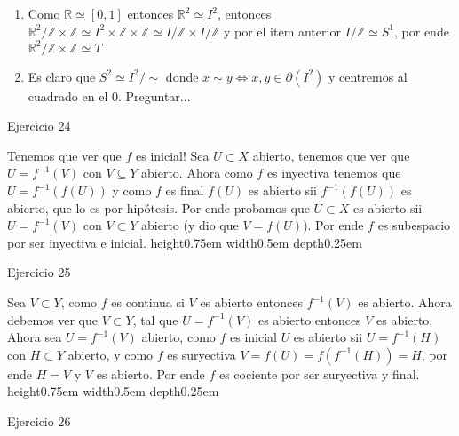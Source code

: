 \documentclass[11pt]{article}
\newcommand{\Z}{\mathbb{Z}}
\newcommand{\R}{{\mathbb{R}}}
\newenvironment{proof}[1][Demostraci\'on]{\begin{trivlist}
\item[\hskip \labelsep {\bfseries #1}]}{\end{trivlist}}
\newcommand{\qed}{\nobreak \ifvmode \relax \else
      \ifdim\lastskip<1.5em \hskip-\lastskip
      \hskip1.5em plus0em minus0.5em \fi \nobreak
      \vrule height0.75em width0.5em depth0.25em\fi}
\begin{document}
\begin{enumerate}
\begin{proof}
\begin{enumerate}
\item Como $\R \simeq [0,1]$ entonces $\R^2 \simeq I^2$, entonces $\R^2 / \Z \times \Z \simeq I^2 \times \Z \times \Z \simeq I / \Z \times I / \Z$ y por el item anterior $I / \Z \simeq S^1$, por ende $\R^2 / \Z \times \Z \simeq T$

\item Es claro que $S^2 \simeq I^2 / \sim$ donde $x \sim y \Longleftrightarrow x,y \in \partial(I^2)$ y centremos al cuadrado en el 0. Preguntar...

\end{enumerate}

\end{proof}

\item {Ejercicio 24}

\begin{proof}

Tenemos que ver que $f$ es inicial! Sea $U \subset X$ abierto, tenemos que ver que $U =f^{-1}(V)$ con $V \subseteq Y$ abierto. Ahora como $f$ es inyectiva tenemos que  $U = f^{-1}(f(U))$ y como $f$ es final $f(U)$ es abierto sii $f^{-1}(f(U))$ es abierto, que lo es por hip\'otesis. Por ende probamos que $U \subset X$ es abierto sii $U = f^{-1}(V)$ con $V \subset Y$ abierto (y dio que $V = f(U)$). Por ende $f$ es subespacio por ser inyectiva e inicial. \qed

\end{proof}

\item {Ejercicio 25}

\begin{proof}

Sea $V \subset Y$, como $f$ es continua si $V$ es abierto entonces $f^{-1}(V)$ es abierto. Ahora debemos ver que $V \subset Y$, tal que $U = f^{-1}(V)$ es abierto entonces $V$ es abierto. Ahora sea $U =  f^{-1}(V)$ abierto, como $f$ es inicial $U$ es abierto sii $U = f^{-1}(H)$ con $H \subset Y$ abierto, y como $f$ es suryectiva $V=f(U) = f(f^{-1}(H)) = H$, por ende $H = V$ y $V$ es abierto. Por ende $f$ es cociente por ser suryectiva y final. \qed

\end{proof}

\item {Ejercicio 26}

\begin{proof}

\begin{enumerate}


\end{enumerate}
\end{proof}
\end{enumerate}
\end{document}
